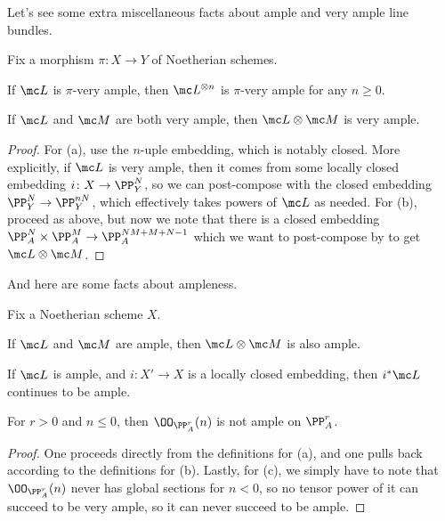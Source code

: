 \documentclass[../notes.tex]{subfiles}
\begin{document}
Let's see some extra miscellaneous facts about ample and very ample line bundles.
\begin{lemma}
	Fix a morphism $\pi\colon X\to Y$ of Noetherian schemes.
	\begin{listalph}
		\item If $\mc L$ is $\pi$-very ample, then $\mc L^{\otimes n}$ is $\pi$-very ample for any $n\ge0$.
		\item If $\mc L$ and $\mc M$ are both very ample, then $\mc L\otimes\mc M$ is very ample. 
	\end{listalph}
\end{lemma}
\begin{proof}
	For (a), use the $n$-uple embedding, which is notably closed. More explicitly, if $\mc L$ is very ample, then it comes from some locally closed embedding $i\colon X\to\PP^N_Y$, so we can post-compose with the closed embedding $\PP^N_Y\to\PP^{nN}_Y$, which effectively takes powers of $\mc L$ as needed. For (b), proceed as above, but now we note that there is a closed embedding $\PP^N_A\times\PP^M_A\to\PP^{NM+M+N-1}_A$ which we want to post-compose by to get $\mc L\otimes\mc M$.
\end{proof}
And here are some facts about ampleness.
\begin{lemma}
	Fix a Noetherian scheme $X$.
	\begin{listalph}
		\item If $\mc L$ and $\mc M$ are ample, then $\mc L\otimes\mc M$ is also ample.
		\item If $\mc L$ is ample, and $i\colon X'\to X$ is a locally closed embedding, then $i^*\mc L$ continues to be ample.
		\item For $r>0$ and $n\le0$, then $\OO_{\PP^r_A}(n)$ is not ample on $\PP^r_A$.
	\end{listalph}
\end{lemma}
\begin{proof}
	One proceeds directly from the definitions for (a), and one pulls back according to the definitions for (b). Lastly, for (c), we simply have to note that $\OO_{\PP^r_A}(n)$ never has global sections for $n<0$, so no tensor power of it can succeed to be very ample, so it can never succeed to be ample.
\end{proof}
\end{document}

